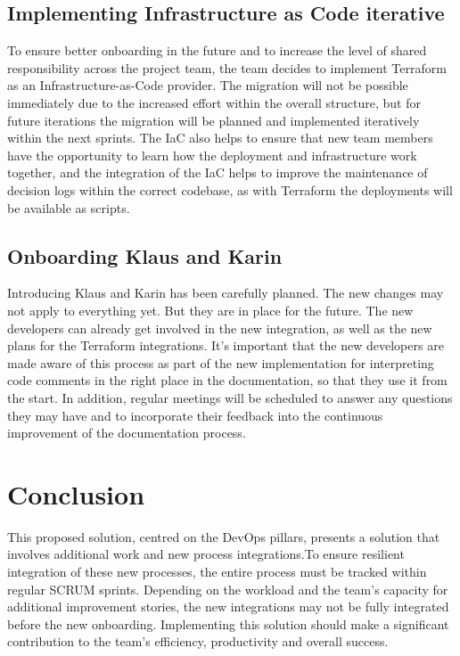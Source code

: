 \subsection{Implementing Infrastructure as Code iterative}
To ensure better onboarding in the future and to increase the level of shared responsibility across the project team, the team decides to implement Terraform as an Infrastructure-as-Code provider. The migration will not be possible immediately due to the increased effort within the overall structure, but for future iterations the migration will be planned and implemented iteratively within the next sprints. The IaC also helps to ensure that new team members have the opportunity to learn how the deployment and infrastructure work together, and the integration of the IaC helps to improve the maintenance of decision logs within the correct codebase, as with Terraform the deployments will be available as scripts.

\subsection{Onboarding Klaus and Karin}
Introducing Klaus and Karin has been carefully planned. The new changes may not apply to everything yet. But they are in place for the future. The new developers can already get involved in the new integration, as well as the new plans for the Terraform integrations. It's important that the new developers are made aware of this process as part of the new implementation for interpreting code comments in the right place in the documentation, so that they use it from the start. In addition, regular meetings will be scheduled to answer any questions they may have and to incorporate their feedback into the continuous improvement of the documentation process.

\section{Conclusion}
This proposed solution, centred on the DevOps pillars, presents a solution that involves additional work and new process integrations.To ensure resilient integration of these new processes, the entire process must be tracked within regular SCRUM sprints. Depending on the workload and the team's capacity for additional improvement stories, the new integrations may not be fully integrated before the new onboarding. Implementing this solution should make a significant contribution to the team's efficiency, productivity and overall success.
